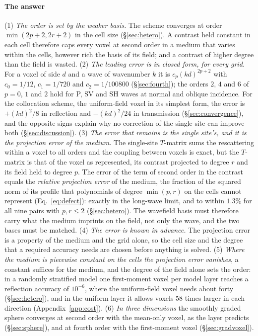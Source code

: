 \documentclass[preprint,review,12pt]{elsarticle}
\begin{document}
\paragraph{The answer} (1) \emph{The order is set by the weaker basis.} The scheme converges at order
$\min(2p+2,2r+2)$ in the cell size (\S\ref{sec:hetero}). A contrast held constant in each cell
therefore caps every voxel at second order in a medium that varies within the cells, however rich the
basis of its field; and a contrast of higher degree than the field is wasted. (2) \emph{The leading
error is in closed form, for every grid.} For a voxel of side $d$ and a wave of wavenumber $k$ it is
$c_p(kd)^{2p+2}$ with $c_0=1/12$, $c_1=1/720$ and $c_2=1/100800$ (\S\ref{sec:fourth}); the orders $2$, $4$
and $6$ of $p=0$, $1$ and $2$ hold for P, SV and SH waves at normal and oblique incidence. For the collocation scheme, the uniform-field voxel in its simplest form, the error
is $+(kd)^2/8$ in reflection and $-(kd)^2/24$ in transmission (\S\ref{sec:convergence}), and the
opposite signs explain why no correction of the single site can improve both
(\S\ref{sec:discussion}). (3) \emph{The error that remains is the single site's, and it is the
projection error of the medium.} The single-site $T$-matrix sums the rescattering within a voxel to all
orders and the coupling between voxels is exact, but the $T$-matrix is that of the voxel as
represented, its contrast projected to degree $r$ and its field held to degree $p$. The error of the
term of second order in the contrast equals the \emph{relative projection error} of the medium, the
fraction of the squared norm of its profile that polynomials of degree $\min(p,r)$ on the cells cannot
represent (Eq.~\eqref{eq:defect}): exactly in the long-wave limit, and to within $1.3\%$ for all nine
pairs with $p,r\le2$ (\S\ref{sec:hetero}). The wavefield basis must therefore carry what the medium
imprints on the field, not only the wave, and the two bases must be matched. (4) \emph{The error is
known in advance.} The projection error is a property of the medium and the grid alone, so the cell
size and the degree that a required accuracy needs are chosen before anything is solved. (5) \emph{Where the medium is piecewise constant on the cells the projection error
vanishes}, a constant suffices for the medium, and the degree of the field alone sets the order: in a
randomly stratified model one first-moment voxel per model layer reaches a reflection accuracy of
$10^{-6}$, where the uniform-field voxel needs about forty (\S\ref{sec:hetero}), and in the uniform
layer it allows voxels $58$ times larger in each direction (Appendix~\ref{app:cost}). (6) \emph{In three
dimensions} the smoothly graded sphere converges at second order with the mean-only voxel, as the layer
predicts (\S\ref{sec:sphere}), and at fourth order with the first-moment voxel (\S\ref{sec:gradvoxel}).
\end{document}
